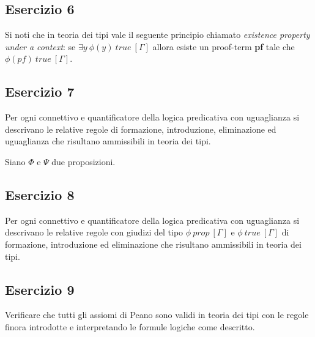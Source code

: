 \subsection{Esercizio 6}
\begin{thm}
	Si noti che in teoria dei tipi vale il seguente principio chiamato \textit{existence property under a context}: se $\exists y~\phi(y)~true~[\Gamma]$ allora esiste un proof-term \textbf{pf} tale che $\phi(pf)~true~[\Gamma]$.
\end{thm}


\subsection{Esercizio 7}
\begin{thm}
	Per ogni connettivo e quantificatore della logica predicativa con uguaglianza si descrivano le relative regole di formazione, introduzione, eliminazione ed uguaglianza che risultano ammissibili in teoria dei tipi.
\end{thm}
Siano $\Phi$ e $\Psi$ due proposizioni.


\subsection{Esercizio 8}
\begin{thm}
	Per ogni connettivo e quantificatore della logica predicativa con uguaglianza si descrivano le relative regole con giudizi del tipo $\phi~prop~[\Gamma]$ e $\phi~true~[\Gamma]$ di formazione, introduzione ed eliminazione che risultano ammissibili in teoria dei tipi.
\end{thm}


\subsection{Esercizio 9}
\begin{thm}
	Verificare che tutti gli assiomi di Peano sono validi in teoria dei tipi con le regole finora introdotte e interpretando le formule logiche come descritto.
\end{thm}

